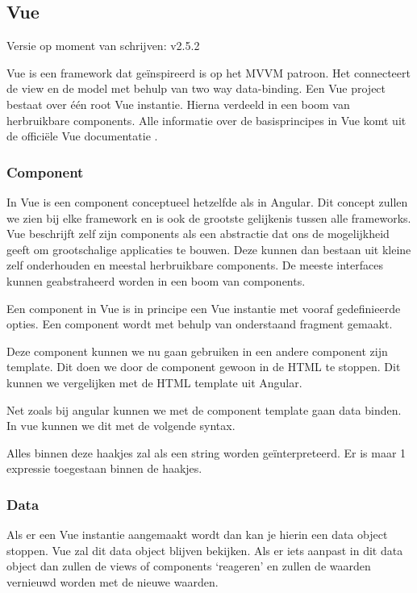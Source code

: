 \subsection{Vue}
\label{sec:JavaScript_Frameworks_Vue}
Versie op moment van schrijven: v2.5.2

Vue is een framework dat geïnspireerd is op het MVVM patroon. Het connecteert de view en de model met behulp van two way data-binding. Een Vue project bestaat over één root Vue instantie. Hierna verdeeld in een boom van herbruikbare components.
Alle informatie over de basisprincipes in Vue komt uit de officiële Vue documentatie \autocite{_vue_2018}.

\subsubsection{Component}
\label{sec:Vue_Component}
In Vue is een component conceptueel hetzelfde als in Angular. Dit concept zullen we zien bij elke framework en is ook de grootste gelijkenis tussen alle frameworks. Vue beschrijft zelf zijn components als een abstractie dat ons de mogelijkheid geeft om grootschalige applicaties te bouwen. Deze kunnen dan bestaan uit kleine zelf onderhouden en meestal herbruikbare components. De meeste interfaces kunnen geabstraheerd worden in een boom van components.

Een component in Vue is in principe een Vue instantie met vooraf gedefinieerde opties. Een component wordt met behulp van onderstaand fragment gemaakt.


Deze component kunnen we nu gaan gebruiken in een andere component zijn template. Dit doen we door de component gewoon in de HTML te stoppen. Dit kunnen we vergelijken met de HTML template uit Angular.


Net zoals bij angular kunnen we met de component template gaan data binden. In vue kunnen we dit met de volgende syntax.


Alles binnen deze haakjes zal als een string worden geïnterpreteerd. Er is maar 1 expressie toegestaan binnen de haakjes. 

\subsubsection{Data}
\label{sec:Vue_Data}
Als er een Vue instantie aangemaakt wordt dan kan je hierin een data object stoppen. Vue zal dit data object blijven bekijken. Als er iets aanpast in dit data object dan zullen de views of components ‘reageren’ en zullen de waarden vernieuwd worden met de nieuwe waarden.


